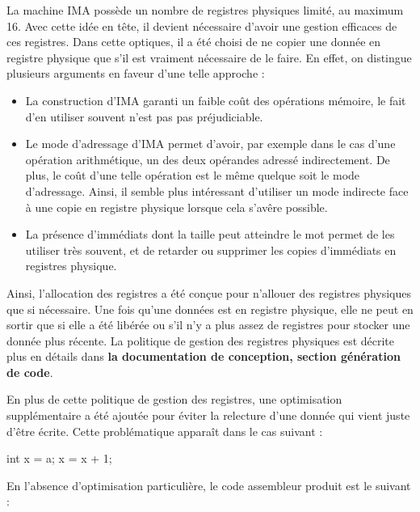 \documentclass[
]{article}
\newenvironment{Shaded}{}{}
\newcommand{\DataTypeTok}[1]{\textcolor[rgb]{0.56,0.13,0.00}{#1}}
\newcommand{\DecValTok}[1]{\textcolor[rgb]{0.25,0.63,0.44}{#1}}
\newcommand{\NormalTok}[1]{#1}
\newcommand{\OperatorTok}[1]{\textcolor[rgb]{0.40,0.40,0.40}{#1}}
\begin{document}
La machine IMA possède un nombre de registres physiques limité, au
maximum 16. Avec cette idée en tête, il devient nécessaire d'avoir une
gestion efficaces de ces registres. Dans cette optiques, il a été choisi
de ne copier une donnée en registre physique que s'il est vraiment
nécessaire de le faire. En effet, on distingue plusieurs arguments en
faveur d'une telle approche :

\begin{itemize}
\item
  La construction d'IMA garanti un faible coût des opérations mémoire,
  le fait d'en utiliser souvent n'est pas pas préjudiciable.
\item
  Le mode d'adressage d'IMA permet d'avoir, par exemple dans le cas
  d'une opération arithmétique, un des deux opérandes adressé
  indirectement. De plus, le coût d'une telle opération est le même
  quelque soit le mode d'adressage. Ainsi, il semble plus intéressant
  d'utiliser un mode indirecte face à une copie en registre physique
  lorsque cela s'avêre possible.
\item
  La présence d'immédiats dont la taille peut atteindre le mot permet de
  les utiliser très souvent, et de retarder ou supprimer les copies
  d'immédiats en registres physique.
\end{itemize}

Ainsi, l'allocation des registres a été conçue pour n'allouer des
registres physiques que si nécessaire. Une fois qu'une données est en
registre physique, elle ne peut en sortir que si elle a été libérée ou
s'il n'y a plus assez de registres pour stocker une donnée plus récente.
La politique de gestion des registres physiques est décrite plus en
détails dans \textbf{la documentation de conception, section génération
de code}.

En plus de cette politique de gestion des registres, une optimisation
supplémentaire a été ajoutée pour éviter la relecture d'une donnée qui
vient juste d'être écrite. Cette problématique apparaît dans le cas
suivant :

\begin{Shaded}
\begin{Highlighting}[]
\DataTypeTok{int}\NormalTok{ x }\OperatorTok{=}\NormalTok{ a}\OperatorTok{;}
\NormalTok{x }\OperatorTok{=}\NormalTok{ x }\OperatorTok{+} \DecValTok{1}\OperatorTok{;}
\end{Highlighting}
\end{Shaded}

En l'absence d'optimisation particulière, le code assembleur produit est
le suivant :
\end{document}
